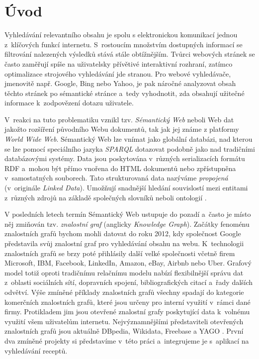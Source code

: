 \chapter*{Úvod}

Vyhledávání relevantního obsahu je spolu s elektronickou komunikací jednou z~klíčových funkcí internetu. S~rostoucím množstvím dostupných informací se filtrování nalezených výsledků stává stále obtížnějším. Tvůrci webových stránek se často zaměřují spíše na uživatelsky přívětivé interaktivní rozhraní, zatímco optimalizace strojového vyhledávání jde stranou. Pro webové vyhledávače, jmenovitě např. Google, Bing nebo Yahoo, je pak náročné analyzovat obsah těchto stránek po sémantické stránce a~tedy vyhodnotit, zda obsahují užitečné informace k~zodpovězení dotazu uživatele.

V~reakci na tuto problematiku vznikl tzv. \emph{Sémantický Web} neboli Web dat jakožto rozšíření původního Webu dokumentů, tak jak jej známe z platformy \emph{World Wide Web}. Sémantický Web lze vnímat jako globální databázi, nad kterou se lze pomocí speciálního jazyka \emph{SPARQL} dotazovat podobně jako nad tradičními databázovými systémy. Data jsou poskytována v~různých serializacích formátu RDF a~mohou být přímo vnořena do HTML dokumentů nebo zpřístupněna v~samostatných souborech. Tato strukturovaná data nazýváme \emph{propojená} (v~originále \emph{Linked Data}). Umožňují snadnější hledání souvislostí mezi entitami z~různých zdrojů na základě společných slovníků neboli ontologií \citep{semantic-web}.

V posledních letech termín Sémantický Web ustupuje do pozadí a~často je místo něj zmiňován tzv. \emph{znalostní graf} (anglicky \emph{Knowledge Graph}). Začátky fenoménu znalostních grafů bychom mohli datovat do roku 2012, kdy společnost Google představila svůj znalostní graf pro vyhledávání obsahu na webu. K~technologii znalostních grafů se brzy poté přihlásily další velké společnosti včetně firem Microsoft, IBM, Facebook, LinkedIn, Amazon, eBay, Airbnb nebo Uber. Grafový model totiž oproti tradičnímu relačnímu modelu nabízí flexibilnější správu dat z~oblasti sociálních sítí, dopravních spojení, bibliografických citací a~řady dalších odvětví. Výše zmíněné příklady znalostních grafů všechny spadají do kategorie komerčních znalostních grafů, které jsou určeny pro interní využití v~rámci dané firmy. Protikladem jim jsou otevřené znalostní grafy poskytující data k~volnému využití všem uživatelům internetu. Nejvýznamnějšími představiteli otevřených znalostních grafů jsou aktuálně DBpedia, Wikidata, Freebase a YAGO \citep{kg-book}. První dva zmíněné projekty si představíme v~této práci a~integrujeme je s~aplikací na vyhledávání receptů.

